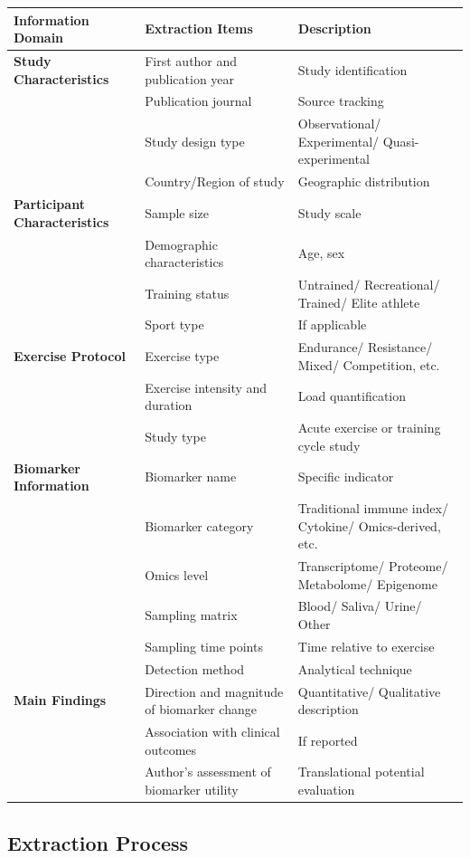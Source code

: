 \documentclass[12pt,a4paper]{article}
\begin{document}
\begin{longtable}{p{3.5cm}p{5cm}p{5.5cm}}
\toprule
\textbf{Information Domain} & \textbf{Extraction Items} & \textbf{Description} \\
\midrule
\endhead
\textbf{Study Characteristics} & First author and publication year & Study identification \\
 & Publication journal & Source tracking \\
 & Study design type & Observational/ Experimental/ Quasi-experimental \\
 & Country/Region of study & Geographic distribution \\
\midrule
\textbf{Participant Characteristics} & Sample size & Study scale \\
 & Demographic characteristics & Age, sex \\
 & Training status & Untrained/ Recreational/ Trained/ Elite athlete \\
 & Sport type & If applicable \\
\midrule
\textbf{Exercise Protocol} & Exercise type & Endurance/ Resistance/ Mixed/ Competition, etc. \\
 & Exercise intensity and duration & Load quantification \\
 & Study type & Acute exercise or training cycle study \\
\midrule
\textbf{Biomarker Information} & Biomarker name & Specific indicator \\
 & Biomarker category & Traditional immune index/ Cytokine/ Omics-derived, etc. \\
 & Omics level & Transcriptome/ Proteome/ Metabolome/ Epigenome \\
 & Sampling matrix & Blood/ Saliva/ Urine/ Other \\
 & Sampling time points & Time relative to exercise \\
 & Detection method & Analytical technique \\
\midrule
\textbf{Main Findings} & Direction and magnitude of biomarker change & Quantitative/ Qualitative description \\
 & Association with clinical outcomes & If reported \\
 & Author's assessment of biomarker utility & Translational potential evaluation \\
\bottomrule
\end{longtable}

\subsection{Extraction Process}
\end{document}
